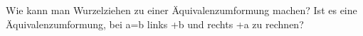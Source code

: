 Wie kann man Wurzelziehen zu einer Äquivalenzumformung machen?
Ist es eine Äquivalenzumformung, bei a=b links +b und rechts +a zu rechnen?